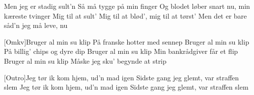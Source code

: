 \documentclass[a4paper,11pt]{article}
\begin{document}
\begin{song}
Men jeg er stadig sult'n
Så må tygge på min finger
Og blodet løber snart nu, min kæreste tvinger
Mig til at sult'
Mig til at blød', mig til at tørst'
Men det er bare såd'n jeg må leve, nu

[Omkv]Bruger al min su klip
På franske hotter med sennep 
Bruger al min su klip
På billig' chips og dyre dip
Bruger al min su klip
Min bankrådgiver får et flip
Bruger al min su klip
Måske jeg sku' begynde at strip 

[Outro]Jeg tør ik kom hjem, ud'n mad igen
Sidste gang jeg glemt, var straffen slem
Jeg tør ik kom hjem, ud'n mad igen
Sidste gang jeg glemt, var straffen slem
\end{song}
\end{document}
